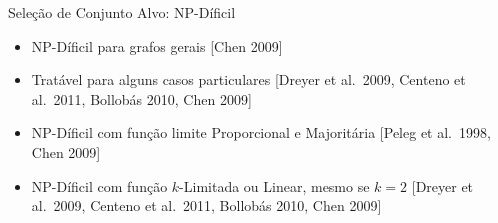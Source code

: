 \documentclass{beamer}
\begin{document}
\begin{frame}{Seleção de Conjunto Alvo: NP-Díficil}


\begin{itemize}
\tightlist
\item NP-Díficil para grafos gerais {[}Chen 2009{]}
\item
  Tratável para alguns casos particulares {[}Dreyer et al.~2009, Centeno
  et al.~2011, Bollobás 2010, Chen 2009{]}
\item
  NP-Díficil com função limite Proporcional e Majoritária {[}Peleg et al.~1998, Chen 2009{]}
\item
  NP-Díficil com função $k$-Limitada ou Linear, mesmo se $k=2$ {[}Dreyer et al.~2009, Centeno et al.~2011,
  Bollobás 2010, Chen 2009{]}
\end{itemize}


\end{frame}
\end{document}
